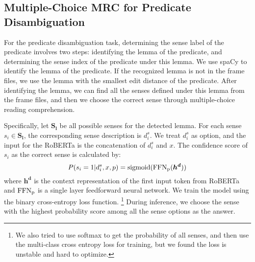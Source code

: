 \documentclass[11pt]{article}
\begin{document}
\subsection{Multiple-Choice MRC for Predicate Disambiguation}
For the predicate disambiguation task, determining the sense label of the predicate involves two steps: identifying the lemma of the predicate, and determining the sense index of the predicate under this lemma. We use spaCy \cite{spacy} to identify the lemma of the predicate. If the recognized lemma is not in the frame files, we use the lemma with the smallest edit distance of the predicate. After identifying the lemma, we can find all the senses defined under this lemma from the frame files, and then we choose the correct sense through multiple-choice reading comprehension.
\par
Specifically, let $\bm{S_l}$ be all possible senses for the detected lemma. For each sense $s_i\in \bm{S_l}$, the corresponding sense description is $d^s_i$. We treat $d^s_i$ as option, and the input for the RoBERTa is the concatenation of $d^s_i$ and $x$. The confidence score of $s_i$ as the correct sense is calculated by:
\begin{equation}
    P(s_i=1|d^s_i, x,p)={\rm sigmoid} ({\rm FFN_p}(\bm{h^d}))  \label{eq:pd}
\end{equation}
where $\bm{h^d}$ is the context representation of the first input token from RoBERTa and ${\rm FFN_p}$ is a single layer feedforward  neural network. We train the model using the binary cross-entropy loss function. 
\footnote{We also tried to use softmax to get the probability of all senses, and then use the multi-class cross entropy loss for training, but we found the loss is unstable and hard to optimize.}
During inference, we choose the sense with the highest probability score among all the sense options as the answer.
\par
\end{document}
